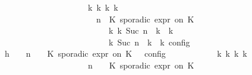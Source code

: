 \begin{isabellebody}
\ \ \ \ \ \ \ \ \ \ \ \ \ \ \ \ \ \ \ \ {\isasymLongrightarrow}\ {\isasymexists}{\isasymGamma}\isactrlsub k\ {\isasymPsi}\isactrlsub k\ {\isasymPhi}\isactrlsub k\ k{\isachardot}\isanewline
\ \ \ \ \ \ \ \ \ \ \ \ \ \ \ \ \ \ \ \ \ \ {\isacharparenleft}{\isacharparenleft}{\isasymGamma}{\isacharcomma}\ n\ {\isasymturnstile}\ {\isacharparenleft}{\isacharparenleft}K\ sporadic{\isasymsharp}\ {\isasymtau}\isactrlsub e\isactrlsub x\isactrlsub p\isactrlsub r\ on\ K\ {\isacharhash}\ {\isasymPsi}{\isacharparenright}\ {\isasymtriangleright}\ {\isasymPhi}{\isacharparenright}\isanewline
\ \ \ \ \ \ \ \ \ \ \ \ \ \ \ \ \ \ \ \ \ \ \ \ \ \ {\isasymhookrightarrow}\isactrlbsup k\isactrlesup \ {\isacharparenleft}{\isasymGamma}\isactrlsub k{\isacharcomma}\ Suc\ n\ {\isasymturnstile}\ {\isasymPsi}\isactrlsub k\ {\isasymtriangleright}\ {\isasymPhi}\isactrlsub k{\isacharparenright}{\isacharparenright}\isanewline
\ \ \ \ \ \ \ \ \ \ \ \ \ \ \ \ \ \ \ \ \ \ {\isasymand}\ {\isasymrho}\ {\isasymin}\ {\isasymlbrakk}\ {\isasymGamma}\isactrlsub k{\isacharcomma}\ Suc\ n\ {\isasymturnstile}\ {\isasymPsi}\isactrlsub k\ {\isasymtriangleright}\ {\isasymPhi}\isactrlsub k\ {\isasymrbrakk}\isactrlsub c\isactrlsub o\isactrlsub n\isactrlsub f\isactrlsub i\isactrlsub g{\isacartoucheclose}\isanewline
\ \ \ \ \ \ \ \ \isamarkupfalse%
\ {\isacharminus}\isanewline
\ \ \ \ \ \ \ \ \ \ \isamarkupfalse%
\ h{\isacharcolon}{\isacartoucheopen}{\isasymrho}\ {\isasymin}\ {\isasymlbrakk}\ {\isasymGamma}{\isacharcomma}\ n\ {\isasymturnstile}\ {\isasymPsi}\ {\isasymtriangleright}\ {\isacharparenleft}{\isacharparenleft}K\ sporadic{\isasymsharp}\ {\isasymtau}\isactrlsub e\isactrlsub x\isactrlsub p\isactrlsub r\ on\ K\ {\isacharhash}\ {\isasymPhi}{\isacharparenright}\ {\isasymrbrakk}\isactrlsub c\isactrlsub o\isactrlsub n\isactrlsub f\isactrlsub i\isactrlsub g{\isacartoucheclose}\isanewline
\ \ \ \ \ \ \ \ \ \ \isamarkupfalse%
\ {\isacartoucheopen}{\isasymexists}{\isasymGamma}\isactrlsub k\ {\isasymPsi}\isactrlsub k\ {\isasymPhi}\isactrlsub k\ k{\isachardot}\isanewline
\ \ \ \ \ \ \ \ \ \ \ \ \ \ \ \ \ \ \ \ {\isacharparenleft}{\isacharparenleft}{\isasymGamma}{\isacharcomma}\ n\ {\isasymturnstile}\ {\isasymPsi}\ {\isasymtriangleright}\ {\isacharparenleft}{\isacharparenleft}K\ sporadic{\isasymsharp}\ {\isasymtau}\isactrlsub e\isactrlsub x\isactrlsub p\isactrlsub r\ on\ K\ {\isacharhash}\ {\isasymPhi}{\isacharparenright}{\isacharparenright}\isanewline

\end{isabellebody}
